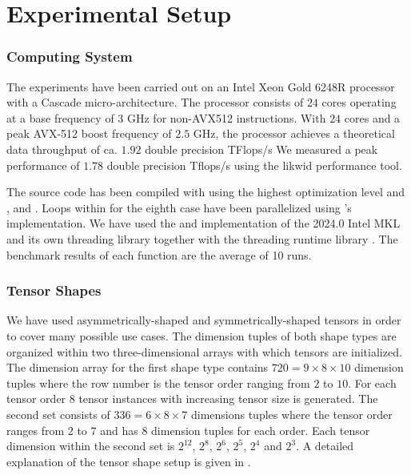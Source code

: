 \section{Experimental Setup}
\label{sec:experimental.setup}
\subsubsection{Computing System} 
The experiments have been carried out on an Intel Xeon Gold 6248R processor with a Cascade micro-architecture. The processor consists of $24$ cores operating at a base frequency of $3$ GHz for non-AVX512 instructions.
With $24$ cores and a peak AVX-512 boost frequency of $2.5$ GHz, the processor achieves a theoretical data throughput of ca. $1.92$ double precision TFlops/s
We measured a peak performance of $1.78$ double precision Tflops/s using the likwid performance tool.

The source code has been compiled with   using the highest optimization level  and ,  and . 
Loops within for the eighth case have been parallelized using 's   implementation.
We have used the  and  implementation of the 2024.0 Intel MKL and its own threading library  together with the threading runtime library .
The benchmark results of each function are the average of 10 runs.



\subsubsection{Tensor Shapes} 
We have used asymmetrically-shaped and symmetrically-shaped tensors in order to cover many possible use cases. 
The dimension tuples of both shape types are organized within two three-dimensional arrays with which tensors are initialized.
The dimension array for the first shape type contains $720 = 9\times 8 \times 10$ dimension tuples where the row number is the tensor order ranging from $2$ to $10$. 
For each tensor order $8$ tensor instances with increasing tensor size is generated.
The second set consists of $336 = 6\times8\times 7$ dimensions tuples where the tensor order ranges from $2$ to $7$ and has $8$ dimension tuples for each order.
Each tensor dimension within the second set is $2^{12}$, $2^{8}$, $2^{6}$, $2^5$, $2^4$ and $2^3$.
A detailed explanation of the tensor shape setup is given in \cite{bassoy:2019:ttv, bassoy:2018:fast}.

